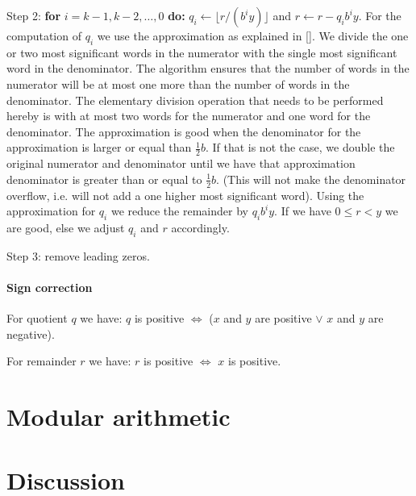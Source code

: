 \documentclass[a4paper]{article}
\begin{document}
Step 2: \textbf{for} $i = k-1, k-2, \ldots, 0$ \textbf{do:}
$q_i \gets \lfloor r / (b^i y) \rfloor$ and $r \gets r - q_i b^i y$.
For the computation of $q_i$ we use the approximation as explained in [\cite{ant}].
We divide the one or two most significant words in the numerator with the single most significant word in the denominator. The algorithm ensures that the number of words in the numerator will be at most one more than the number of words in the denominator.
The elementary division operation that needs to be performed hereby is with at most two words for the numerator and one word for the denominator.
The approximation is good when the denominator for the approximation is larger or equal than $\frac{1}{2} b$. If that is not the case, we double the original numerator and denominator until we have that approximation denominator is greater than or equal to $\frac{1}{2} b$. (This will not make the denominator overflow, i.e. will not add a one higher most significant word).
Using the approximation for $q_i$ we reduce the remainder by $q_i b^i y$.
If we have $0 \le r < y$ we are good, else we adjust $q_i$ and $r$ accordingly.

Step 3: remove leading zeros.


\paragraph{Sign correction}

For quotient $q$ we have: $q$ is positive $\iff$ ($x$ and $y$ are positive $\lor$ $x$ and $y$ are negative).

For remainder $r$ we have: $r$ is positive $\iff$ $x$ is positive.


\section{Modular arithmetic}




\section{Discussion}

\end{document}
